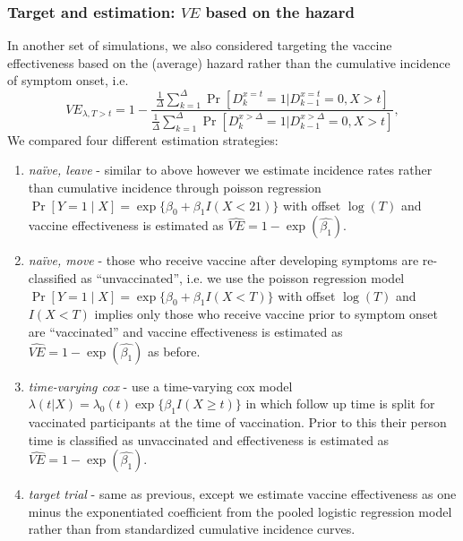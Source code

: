 \begin{appendices}
\begin{refsection}
    \subsubsection{Target and estimation: $VE$ based on the hazard}
    In another set of simulations, we also considered targeting the vaccine effectiveness based on the  (average) hazard rather than the cumulative incidence of symptom onset, i.e.
    $$
    VE_{\lambda,T > t} = 1 - \dfrac{\frac{1}{\Delta}\sum_{k=1}^{\Delta}\Pr[D_k^{x = t} = 1 | D_{k-1}^{x=t} = 0, X > t]}{\frac{1}{\Delta}\sum_{k=1}^{\Delta}\Pr[D_k^{x > \Delta} = 1 | D_{k-1}^{x > \Delta} = 0, X > t]},
    $$
    We compared four different estimation strategies:
    \begin{enumerate}
        \item \textit{na\"{i}ve, leave} - similar to above however we estimate incidence rates rather than cumulative incidence through poisson regression $\Pr[Y = 1 \mid X] = \operatorname{exp}\{\beta_0 + \beta_1 I(X < 21)\}$ with offset $\log(T)$ and vaccine effectiveness is estimated as $\widehat{VE} = 1 - \exp(\widehat{\beta_1})$.
        \item \textit{na\"{i}ve, move} - those who receive vaccine after developing symptoms are re-classified as ``unvaccinated'', i.e. we use the poisson regression model $\Pr[Y = 1 \mid X] = \operatorname{exp}\{\beta_0 + \beta_1 I(X < T)\}$ with offset $\log(T)$ and $I(X<T)$ implies only those who receive vaccine prior to symptom onset are ``vaccinated'' and vaccine effectiveness is estimated as $\widehat{VE} = 1 - \exp(\widehat{\beta_1})$ as before.
        \item \textit{time-varying cox} - use a time-varying cox model $\lambda(t|X) = \lambda_0(t) \exp\{\beta_1 I(X \geq t)\}$ in which follow up time is split for vaccinated participants at the time of vaccination. Prior to this their person time is classified as unvaccinated and effectiveness is estimated as $\widehat{VE} = 1 - \exp(\widehat{\beta_1})$.
        \item \textit{target trial} - same as previous, except  we estimate vaccine effectiveness as one minus the exponentiated coefficient from the pooled logistic regression model rather than from standardized cumulative incidence curves.
    \end{enumerate}


\end{refsection}
\end{appendices}
